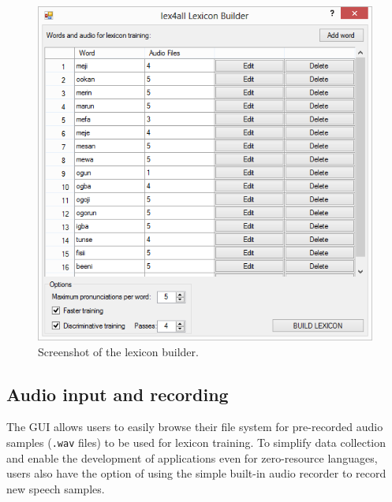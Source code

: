 \documentclass[11pt]{article}
\begin{document}
\begin{figure}[tb]
\begin{center}
\includegraphics[width=\columnwidth]{../screenshots/LexiconBuilder-Main-Filled-scrolling.PNG}
\caption{Screenshot of the lexicon builder.\label{fig:mainform}}
\end{center}
\end{figure}

\subsection{Audio input and recording}
\label{sec:recording}


The GUI allows users to easily browse their file system for pre-recorded audio samples (\texttt{.wav} files) to be used for lexicon training. 
To simplify data collection and enable the development of applications even for zero-resource languages, users also have the option of using the simple built-in audio recorder to record new speech samples.
\end{document}
